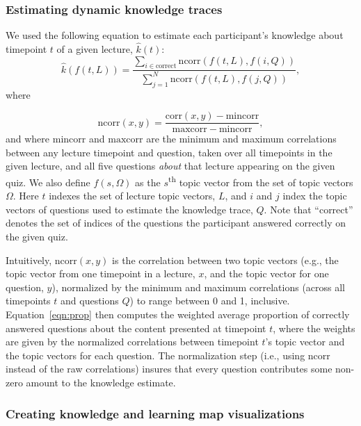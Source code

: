 \documentclass[10pt]{article}
\begin{document}
\subsubsection*{Estimating dynamic knowledge traces}\label{subsec:traces}

We used the following equation to estimate each participant's knowledge about
timepoint $t$ of a given lecture, $\hat{k}(t)$:
\begin{equation}
    \hat{k}\left(f(t, L)\right) = \frac{\sum_{i \in \mathrm{correct}}\mathrm{ncorr}\left(f(t, L), f(i, Q)\right)}{\sum_{j = 1}^N \mathrm{ncorr}\left(f(t, L), f(j, Q)\right)},
    \label{eqn:prop}
\end{equation}
where

\begin{equation}
    \mathrm{ncorr}(x, y) = \frac{\mathrm{corr}(x, y) - \mathrm{mincorr}}{\mathrm{maxcorr} - \mathrm{mincorr}},
\end{equation}
and where $\mathrm{mincorr}$ and $\mathrm{maxcorr}$ are the minimum and maximum
correlations between any lecture timepoint and question, taken over all
timepoints in the given lecture, and all five questions \textit{about} that lecture appearing on the given quiz.
We also define $f(s, \Omega)$ as the
$s$\textsuperscript{th} topic vector from the set of topic vectors $\Omega$.
Here $t$ indexes the set of lecture topic vectors, $L$, and $i$ and $j$ index
the topic vectors of questions used to estimate the knowledge trace, $Q$. Note
that ``correct'' denotes the set of indices of the questions the participant
answered correctly on the given quiz.

Intuitively, $\mathrm{ncorr}(x, y)$ is the correlation between two topic
vectors (e.g., the topic vector from one timepoint in a lecture, $x$, and the
topic vector for one question, $y$), normalized by the minimum and maximum
correlations (across all timepoints $t$ and questions $Q$) to range between 0 and 1,
inclusive. Equation~\ref{eqn:prop} then computes the weighted average
proportion of correctly answered questions about the content presented at
timepoint $t$, where the weights are given by the normalized correlations
between timepoint $t$'s topic vector and the topic vectors for each question.
The normalization step (i.e., using $\mathrm{ncorr}$ instead of the raw
correlations) insures that every question
contributes some non-zero amount to the knowledge estimate.

\subsubsection*{Creating knowledge and learning map visualizations}\label{subsec:knowledge-maps}
\end{document}
